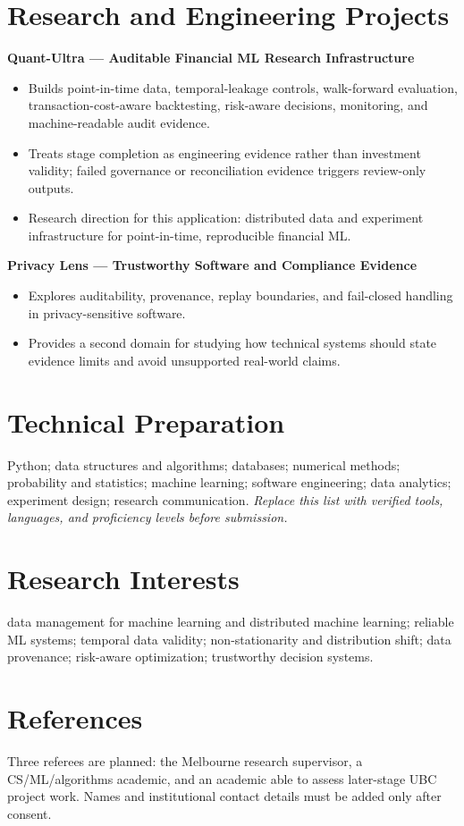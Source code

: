 \documentclass[11pt]{article}
\begin{document}
\section*{Research and Engineering Projects}
\textbf{Quant-Ultra --- Auditable Financial ML Research Infrastructure}
\begin{itemize}
\item Builds point-in-time data, temporal-leakage controls, walk-forward evaluation, transaction-cost-aware backtesting, risk-aware decisions, monitoring, and machine-readable audit evidence.
\item Treats stage completion as engineering evidence rather than investment validity; failed governance or reconciliation evidence triggers review-only outputs.
\item Research direction for this application: distributed data and experiment infrastructure for point-in-time, reproducible financial ML.
\end{itemize}

\begin{samepage}
\textbf{Privacy Lens --- Trustworthy Software and Compliance Evidence}
\begin{itemize}
\item Explores auditability, provenance, replay boundaries, and fail-closed handling in privacy-sensitive software.
\item Provides a second domain for studying how technical systems should state evidence limits and avoid unsupported real-world claims.
\end{itemize}
\end{samepage}

\section*{Technical Preparation}
Python; data structures and algorithms; databases; numerical methods; probability and statistics; machine learning; software engineering; data analytics; experiment design; research communication. \textit{Replace this list with verified tools, languages, and proficiency levels before submission.}

\section*{Research Interests}
data management for machine learning and distributed machine learning; reliable ML systems; temporal data validity; non-stationarity and distribution shift; data provenance; risk-aware optimization; trustworthy decision systems.

\section*{References}
Three referees are planned: the Melbourne research supervisor, a CS/ML/algorithms academic, and an academic able to assess later-stage UBC project work. Names and institutional contact details must be added only after consent.
\end{document}
